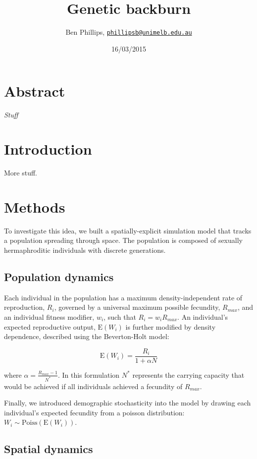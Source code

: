 \documentclass[]{article}
\title{Genetic backburn}
\author{Ben Phillips,
\href{mailto:phillipsb@unimelb.edu.au}{\nolinkurl{phillipsb@unimelb.edu.au}}}
\date{16/03/2015}
\begin{document}
\maketitle


\section{Abstract}\label{abstract}

\emph{Stuff}

\section{Introduction}\label{introduction}

More stuff.

\section{Methods}\label{methods}

To investigate this idea, we built a spatially-explicit simulation model
that tracks a population spreading through space. The population is
composed of sexually hermaphroditic individuals with discrete
generations.

\subsection{Population dynamics}\label{population-dynamics}

Each individual in the population has a maximum density-independent rate
of reproduction, \(R_i\), governed by a universal maximum possible
fecundity, \(R_{max}\), and an individual fitness modifier, \(w_{i}\),
such that \(R_i=w_{i}R_{max}\). An individual's expected reproductive
output, \(\text{E}(W_i)\) is further modified by density dependence,
described using the Beverton-Holt model:

\[ \text{E}(W_i)=\frac{R_i}{1+\alpha N}\]

where \(\alpha=\frac{R_{max}-1}{N^*}\). In this formulation \(N^*\)
represents the carrying capacity that would be achieved if all
individuals achieved a fecundity of \(R_{max}\).

Finally, we introduced demographic stochasticity into the model by
drawing each individual's expected fecundity from a poisson
distribution: \(W_i\sim\text{Poiss}(\text{E}(W_i))\).

\subsection{Spatial dynamics}\label{spatial-dynamics}
\end{document}
